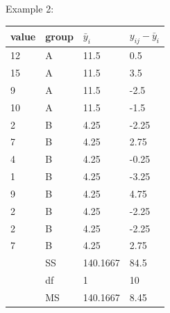 \begin{frame}{Example 2:}

\begin{tabular}{ll|ll}
  \hline
  value & group & $\bar y_i$ & $y_{ij} - \bar y_i$ \\ 
  \hline
12  &   A  &       11.5  &       0.5      \\
15  &   A  &       11.5  &       3.5      \\
9   &   A  &       11.5  &       -2.5     \\
10  &   A  &       11.5  &       -1.5     \\
2   &   B  &       4.25  &       -2.25    \\
7   &   B  &       4.25  &       2.75     \\
4   &   B  &       4.25  &       -0.25    \\
1   &   B  &       4.25  &       -3.25    \\
9   &   B  &       4.25  &       4.75     \\
2   &   B  &       4.25  &       -2.25    \\
2   &   B  &       4.25  &       -2.25    \\
7   &   B  &       4.25  &       2.75     \\
   \hline
&   SS  &  140.1667  &     84.5  \\
&   df  &  1       &     10      \\
&   MS  &  140.1667  &     8.45   \\
\end{tabular}
\end{frame}

